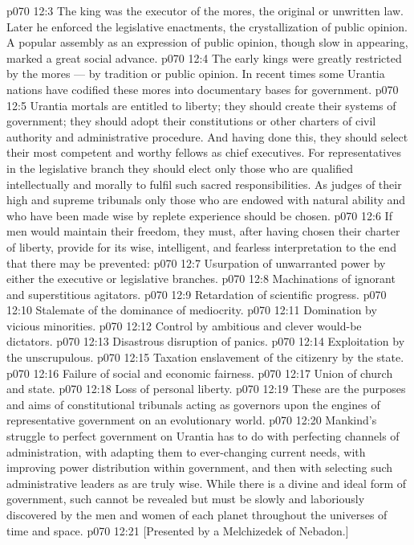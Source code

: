 \vs p070 12:3 The king was the executor of the mores, the original or unwritten law. Later he enforced the legislative enactments, the crystallization of public opinion. A popular assembly as an expression of public opinion, though slow in appearing, marked a great social advance.
\vs p070 12:4 The early kings were greatly restricted by the mores --- by tradition or public opinion. In recent times some Urantia nations have codified these mores into documentary bases for government.
\vs p070 12:5 \pc Urantia mortals are entitled to liberty; they should create their systems of government; they should adopt their constitutions or other charters of civil authority and administrative procedure. And having done this, they should select their most competent and worthy fellows as chief executives. For representatives in the legislative branch they should elect only those who are qualified intellectually and morally to fulfil such sacred responsibilities. As judges of their high and supreme tribunals only those who are endowed with natural ability and who have been made wise by replete experience should be chosen.
\vs p070 12:6 If men would maintain their freedom, they must, after having chosen their charter of liberty, provide for its wise, intelligent, and fearless interpretation to the end that there may be prevented:
\vs p070 12:7 \bibnobreakspace Usurpation of unwarranted power by either the executive or legislative branches.
\vs p070 12:8 \bibnobreakspace Machinations of ignorant and superstitious agitators.
\vs p070 12:9 \bibnobreakspace Retardation of scientific progress.
\vs p070 12:10 \bibnobreakspace Stalemate of the dominance of mediocrity.
\vs p070 12:11 \bibnobreakspace Domination by vicious minorities.
\vs p070 12:12 \bibnobreakspace Control by ambitious and clever would\hyp{}be dictators.
\vs p070 12:13 \bibnobreakspace Disastrous disruption of panics.
\vs p070 12:14 \bibnobreakspace Exploitation by the unscrupulous.
\vs p070 12:15 \bibnobreakspace Taxation enslavement of the citizenry by the state.
\vs p070 12:16 \bibnobreakspace Failure of social and economic fairness.
\vs p070 12:17 \bibnobreakspace Union of church and state.
\vs p070 12:18 \bibnobreakspace Loss of personal liberty.
\vs p070 12:19 \pc These are the purposes and aims of constitutional tribunals acting as governors upon the engines of representative government on an evolutionary world.
\vs p070 12:20 Mankind’s struggle to perfect government on Urantia has to do with perfecting channels of administration, with adapting them to ever\hyp{}changing current needs, with improving power distribution within government, and then with selecting such administrative leaders as are truly wise. While there is a divine and ideal form of government, such cannot be revealed but must be slowly and laboriously discovered by the men and women of each planet throughout the universes of time and space.
\vsetoff
\vs p070 12:21 [Presented by a Melchizedek of Nebadon.]
